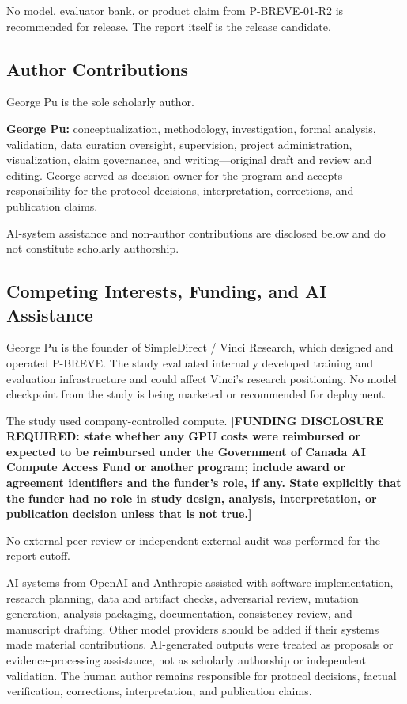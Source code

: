 \documentclass[
  9pt,
  letterpaper,
]{article}
\begin{document}
No model, evaluator bank, or product claim from P-BREVE-01-R2 is
recommended for release. The report itself is the release candidate.

\hypertarget{author-contributions}{%
\subsection{Author Contributions}\label{author-contributions}}

George Pu is the sole scholarly author.

\textbf{George Pu:} conceptualization, methodology, investigation,
formal analysis, validation, data curation oversight, supervision,
project administration, visualization, claim governance, and
writing---original draft and review and editing. George served as
decision owner for the program and accepts responsibility for the
protocol decisions, interpretation, corrections, and publication claims.

AI-system assistance and non-author contributions are disclosed below
and do not constitute scholarly authorship.

\hypertarget{competing-interests-funding-and-ai-assistance}{%
\subsection{Competing Interests, Funding, and AI
Assistance}\label{competing-interests-funding-and-ai-assistance}}

George Pu is the founder of SimpleDirect / Vinci Research, which
designed and operated P-BREVE. The study evaluated internally developed
training and evaluation infrastructure and could affect Vinci's research
positioning. No model checkpoint from the study is being marketed or
recommended for deployment.

The study used company-controlled compute. \textbf{{[}FUNDING DISCLOSURE
REQUIRED: state whether any GPU costs were reimbursed or expected to be
reimbursed under the Government of Canada AI Compute Access Fund or
another program; include award or agreement identifiers and the funder's
role, if any. State explicitly that the funder had no role in study
design, analysis, interpretation, or publication decision unless that is
not true.{]}}

No external peer review or independent external audit was performed for
the report cutoff.

AI systems from OpenAI and Anthropic assisted with software
implementation, research planning, data and artifact checks, adversarial
review, mutation generation, analysis packaging, documentation,
consistency review, and manuscript drafting. Other model providers
should be added if their systems made material contributions.
AI-generated outputs were treated as proposals or evidence-processing
assistance, not as scholarly authorship or independent validation. The
human author remains responsible for protocol decisions, factual
verification, corrections, interpretation, and publication claims.
\end{document}
